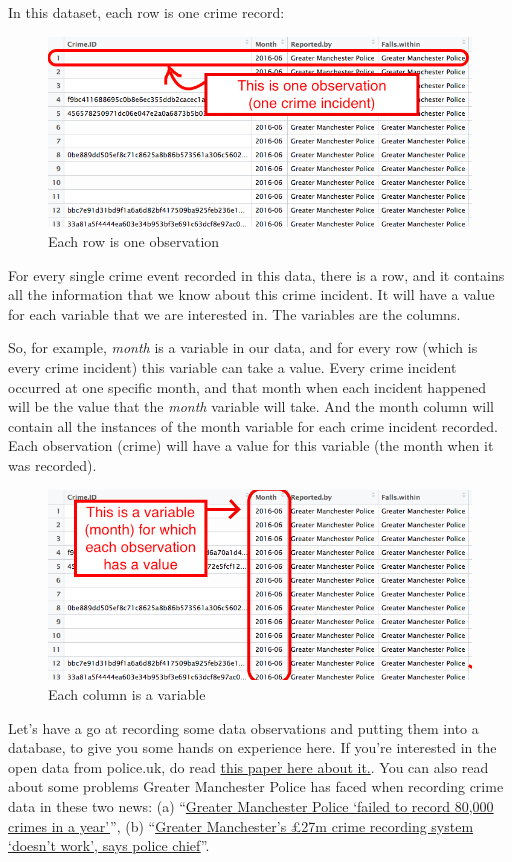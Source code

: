 \documentclass[
]{book}
\begin{document}
In this dataset, each row is one crime record:

\begin{figure}
\centering
\includegraphics{imgs/rowIsObservation.png}
\caption{Each row is one observation}
\end{figure}

For every single crime event recorded in this data, there is a row, and it contains all the information that we know about this crime incident. It will have a value for each variable that we are interested in. The variables are the columns.

So, for example, \emph{month} is a variable in our data, and for every row (which is every crime incident) this variable can take a value. Every crime incident occurred at one specific month, and that month when each incident happened will be the value that the \emph{month} variable will take. And the month column will contain all the instances of the month variable for each crime incident recorded. Each observation (crime) will have a value for this variable (the month when it was recorded).

\begin{figure}
\centering
\includegraphics{imgs/columnIsVariable.png}
\caption{Each column is a variable}
\end{figure}

Let's have a go at recording some data observations and putting them into a database, to give you some hands on experience here. If you're interested in the open data from police.uk, do read \href{http://www.tandfonline.com/doi/abs/10.1080/15230406.2014.972456}{this paper here about it.}. You can also read about some problems Greater Manchester Police has faced when recording crime data in these two news: (a) ``\href{https://www.bbc.co.uk/news/uk-england-manchester-55251366}{Greater Manchester Police `failed to record 80,000 crimes in a year'}'', (b) ``\href{https://www.theguardian.com/uk-news/2021/jun/29/greater-manchesters-27m-recording-system-doesnt-work-says-police-chief}{Greater Manchester's £27m crime recording system `doesn't work', says police chief}''.
\end{document}

